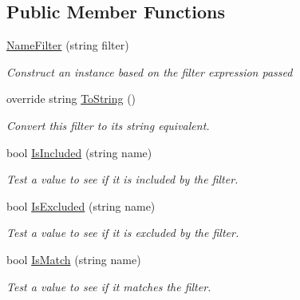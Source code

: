 \subsection*{Public Member Functions}
\begin{DoxyCompactItemize}
\item 
\hyperlink{class_i_c_sharp_code_1_1_sharp_zip_lib_1_1_core_1_1_name_filter_a2fc128fc211a00a0bf41e31d2eec93a4}{Name\+Filter} (string filter)
\begin{DoxyCompactList}\small\item\em Construct an instance based on the filter expression passed \end{DoxyCompactList}\item 
override string \hyperlink{class_i_c_sharp_code_1_1_sharp_zip_lib_1_1_core_1_1_name_filter_a4986231d79362a5ff8e08cffd6a747eb}{To\+String} ()
\begin{DoxyCompactList}\small\item\em Convert this filter to its string equivalent. \end{DoxyCompactList}\item 
bool \hyperlink{class_i_c_sharp_code_1_1_sharp_zip_lib_1_1_core_1_1_name_filter_aa2a8ceae045d15b348529542eece8b32}{Is\+Included} (string name)
\begin{DoxyCompactList}\small\item\em Test a value to see if it is included by the filter. \end{DoxyCompactList}\item 
bool \hyperlink{class_i_c_sharp_code_1_1_sharp_zip_lib_1_1_core_1_1_name_filter_a69a6e50b0d406419ce7dd6dbbd1a70a9}{Is\+Excluded} (string name)
\begin{DoxyCompactList}\small\item\em Test a value to see if it is excluded by the filter. \end{DoxyCompactList}\item 
bool \hyperlink{class_i_c_sharp_code_1_1_sharp_zip_lib_1_1_core_1_1_name_filter_a0c289d44f367f90e2369cfb24bd159e1}{Is\+Match} (string name)
\begin{DoxyCompactList}\small\item\em Test a value to see if it matches the filter. \end{DoxyCompactList}\end{DoxyCompactItemize}
